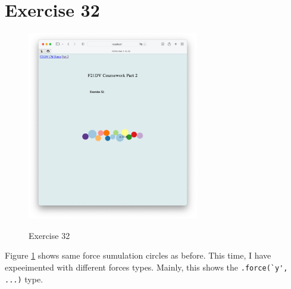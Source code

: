 \documentclass{scrreprt}
\begin{document}
\section{Exercise 32}
\begin{figure}[!ht]
    \centering
    \includegraphics[width = 7.5cm]{images/ex32.png}
    \label{fig:ex32}
    \caption{Exercise 32}
\end{figure}
\FloatBarrier
% 
Figure \ref{fig:ex32} shows same force sumulation circles as before. This time, I have expeeimented with different forces types. Mainly, this shows the \verb|.force(`y', ...)| type.
\end{document}
